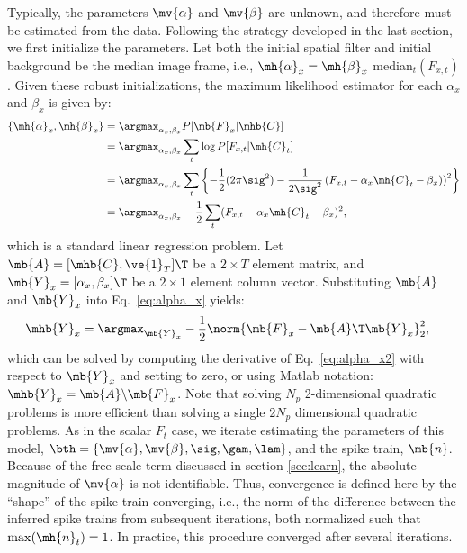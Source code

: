 Typically, the parameters  $\mv{\alpha}$ and $\mv{\beta}$ are unknown, and therefore must be estimated from the data.  Following the strategy developed in the last section, we first initialize the parameters.  Let both the initial spatial filter and initial background be the median image frame, i.e., $\mh{\alpha}_x=\mh{\beta}_x$ median$_t(F_{x,t})$.  Given these robust initializations, the maximum likelihood estimator for each $\alpha_x$ and $\beta_x$ is given by:
\begin{subequations} \label{eq:valpha_x}
\begin{align}
\{\mh{\alpha}_x,\mh{\beta}_x\} 
	&= \argmax_{\alpha_x,\beta_x} P[\mb{F}_x | \mhb{C}] \\
	&= \argmax_{\alpha_x,\beta_x} \sum_t \log P[F_{x,t} | \mh{C}_t] \\
	&=\argmax_{\alpha_x,\beta_x} \sum_t  \left\{-\frac{1}{2} (2\pi \sig^2) - \frac{1}{2\sig^2}\left(F_{x,t} - \alpha_x \mh{C}_t - \beta_x)\right)^2 \right\} \\
	&= \argmax_{\alpha_x,\beta_x} -\frac{1}{2} \sum_t  (F_{x,t} - \alpha_x \mh{C}_t - \beta_x)^2, \label{eq:alpha_x}
\end{align}
\end{subequations}
which is a standard linear regression problem.  Let $\mb{A}=[\mhb{C}, \ve{1}_T]\T$ be a $2\times T$ element matrix, and $\mb{Y}_x=[\alpha_x, \beta_x]\T$ be a $2\times 1$ element column vector.  Substituting $\mb{A}$ and $\mb{Y}_x$ into Eq.~\eqref{eq:alpha_x} yields:
\begin{align}
\mhb{Y}_x &= \argmax_{\mb{Y}_x} -\frac{1}{2} \norm{\mb{F}_{x} - \mb{A}\T \mb{Y}_x}_2^2, \label{eq:alpha_x2}
\end{align}
which can be solved by computing the derivative of Eq.~\eqref{eq:alpha_x2} with respect to $\mb{Y}_x$ and setting to zero, or using Matlab notation: $\mhb{Y}_x = \mb{A} \backslash \mb{F}_x$.  Note that solving $N_p$ 2-dimensional quadratic problems is more efficient than solving a single $2 N_p$ dimensional quadratic problems.  As in the scalar $F_t$ case, we iterate estimating the parameters of this model, $\bth = \{\mv{\alpha}, \mv{\beta}, \sig, \gam, \lam\}$, and the spike train, $\mb{n}$.  Because of the free scale term discussed in section \ref{sec:learn}, the absolute magnitude of $\mv{\alpha}$ is not identifiable.  Thus, convergence is defined here by the ``shape'' of the spike train converging, i.e., the norm of the difference between the inferred spike trains from subsequent iterations, both normalized such that $\max(\mh{n}_t)=1$.  In practice, this procedure converged after several iterations.



